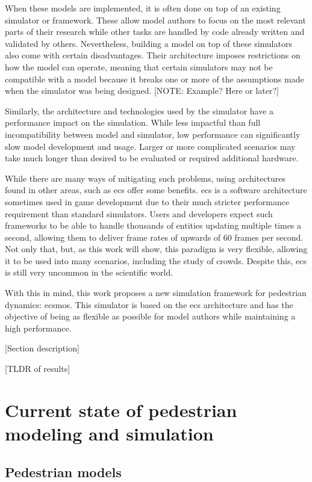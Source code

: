 \documentclass[twoside, 11pt]{article}
\begin{document}
When these models are implemented, it is often done on top of an existing simulator or framework. These allow model authors to focus on the most relevant parts of their research while other tasks are handled by code already written and validated by others. Nevertheless, building a model on top of these simulators also come with certain disadvantages. Their architecture imposes restrictions on how the model can operate, meaning that certain simulators may not be compatible with a model because it breaks one or more of the assumptions made when the simulator was being designed. [NOTE: Example? Here or later?]

Similarly, the architecture and technologies used by the simulator have a performance impact on the simulation. While less impactful than full incompatibility between model and simulator, low performance can significantly slow model development and usage. Larger or more complicated scenarios may take much longer than desired to be evaluated or required additional hardware.

While there are many ways of mitigating such problems, using architectures found in other areas, such as \gls{ecs} offer some benefits. \gls{ecs} is a software architecture sometimes used in game development due to their much stricter performance requirement than standard simulators. Users and developers expect such frameworks to be able to handle thousands of entities updating multiple times a second, allowing them to deliver frame rates of upwards of 60 frames per second. Not only that, but, as this work will show, this paradigm is very flexible, allowing it to be used into many scenarios, including the study of crowds. Despite this, \gls{ecs} is still very uncommon in the scientific world.

With this in mind, this work proposes a new simulation framework for pedestrian dynamics: \gls{ecsmos}. This simulator is based on the \gls{ecs} architecture and has the objective of being as flexible as possible for model authors while maintaining a high performance.

[Section description]

[TLDR of results]

\section{Current state of pedestrian modeling and simulation} \label{overview}

\subsection{Pedestrian models}
\end{document}

